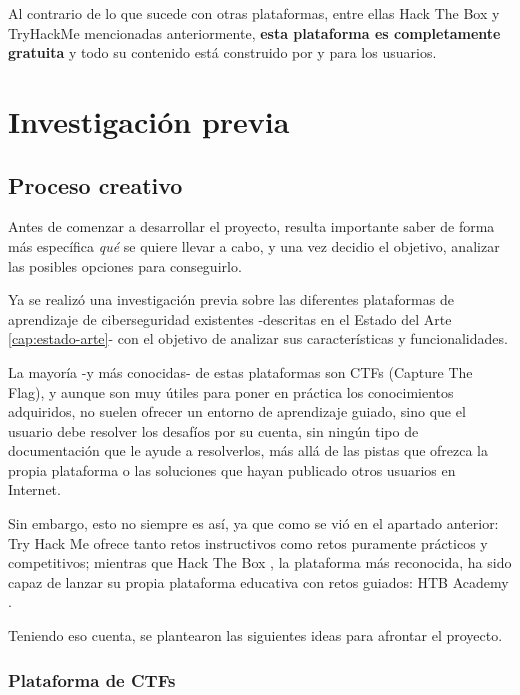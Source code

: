         Al contrario de lo que sucede con otras plataformas, entre ellas Hack The Box y TryHackMe mencionadas anteriormente, \textbf{esta plataforma es completamente gratuita} y todo su contenido está construido por y para los usuarios.
        
        \cleardoublepage
    
    

\chapter{Investigación previa}
    \label{cap:investigacion-previa}

    \section{Proceso creativo}
        \label{sec:proceso-creativo}

        Antes de comenzar a desarrollar el proyecto, resulta importante saber de forma más específica \textit{qué} se quiere llevar a cabo, y una vez decidio el objetivo, analizar las posibles opciones para conseguirlo.
        
        Ya se realizó una investigación previa sobre las diferentes plataformas de aprendizaje de ciberseguridad existentes -descritas en el Estado del Arte \ref{cap:estado-arte}- con el objetivo de analizar sus características y funcionalidades.
        
        La mayoría -y más conocidas- de estas plataformas son CTFs (Capture The Flag), y aunque son muy útiles para poner en práctica los conocimientos adquiridos, no suelen ofrecer un entorno de aprendizaje guiado, sino que el usuario debe resolver los desafíos por su cuenta, sin ningún tipo de documentación que le ayude a resolverlos, más allá de las pistas que ofrezca la propia plataforma o las soluciones que hayan publicado otros usuarios en Internet.

        Sin embargo, esto no siempre es así, ya que como se vió en el apartado anterior: Try Hack Me \cite{tryhackme} ofrece tanto retos instructivos como retos puramente prácticos y competitivos; mientras que Hack The Box \cite{hackthebox}, la plataforma más reconocida, ha sido capaz de lanzar su propia plataforma educativa con retos guiados: HTB Academy \cite{hackthebox-academy}.

        Teniendo eso cuenta, se plantearon las siguientes ideas para afrontar el proyecto.

        \subsection{Plataforma de CTFs}

